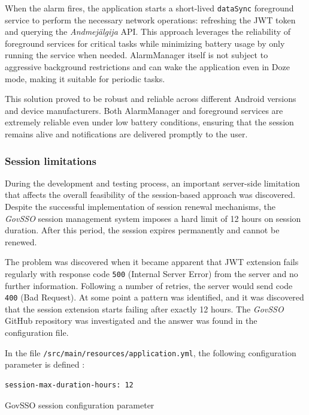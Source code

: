 When the alarm fires, the application starts a short-lived \texttt{dataSync} foreground service to perform the necessary network operations: refreshing the JWT token and querying the \textit{Andmejälgija} API. This approach leverages the reliability of foreground services for critical tasks while minimizing battery usage by only running the service when needed. AlarmManager itself is not subject to aggressive background restrictions and can wake the application even in Doze mode, making it suitable for periodic tasks.

This solution proved to be robust and reliable across different Android versions and device manufacturers. Both AlarmManager and foreground services are extremely reliable even under low battery conditions, ensuring that the session remains alive and notifications are delivered promptly to the user.

\subsubsection{Session limitations}
\label{session-limitations}
During the development and testing process, an important server-side limitation that affects the overall feasibility of the session-based approach was discovered. Despite the successful implementation of session renewal mechanisms, the \textit{GovSSO} session management system imposes a hard limit of 12 hours on session duration. After this period, the session expires permanently and cannot be renewed.

The problem was discovered when it became apparent that JWT extension fails regularly with response code \texttt{500} (Internal Server Error) from the server and no further information. Following a number of retries, the server would send code \texttt{400} (Bad Request). At some point a pattern was identified, and it was discovered that the session extension starts failing after exactly 12 hours. The \textit{GovSSO} GitHub repository \cite{govsso-session} was investigated and the answer was found in the configuration file.

In the file \texttt{/src/main/resources/application.yml}, the following configuration parameter is defined \cite{govsso-session-config}:

\begin{listing}[H]
\begin{verbatim}
session-max-duration-hours: 12
\end{verbatim}
\caption{GovSSO session configuration parameter \cite{govsso-session-config}}
\label{lst:govsso-config}
\end{listing}


